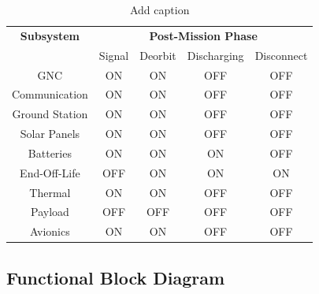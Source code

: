 \begin{table}[htbp]
  \centering
  \caption{Add caption}
    \begin{tabular}{|c|c|c|c|c|}
    \hline
    \textbf{Subsystem} & \multicolumn{4}{c|}{\textbf{Post-Mission Phase}} \\
          & \multicolumn{1}{c}{Signal} & \multicolumn{1}{c}{Deorbit} & \multicolumn{1}{c}{Discharging} & Disconnect \\
    GNC   & \cellcolor[rgb]{ .573,  .816,  .314}ON & \cellcolor[rgb]{ .573,  .816,  .314}ON & \cellcolor[rgb]{ .753,  0,  0}OFF & \cellcolor[rgb]{ .753,  0,  0}OFF \\
Communication & \cellcolor[rgb]{ .573,  .816,  .314}ON & \cellcolor[rgb]{ .573,  .816,  .314}ON & \cellcolor[rgb]{ .753,  0,  0}OFF & \cellcolor[rgb]{ .753,  0,  0}OFF \\
  Ground Station & \cellcolor[rgb]{ .573,  .816,  .314}ON & \cellcolor[rgb]{ .573,  .816,  .314}ON & \cellcolor[rgb]{ .753,  0,  0}OFF & \cellcolor[rgb]{ .753,  0,  0}OFF \\
    Solar Panels  & \cellcolor[rgb]{ .573,  .816,  .314}ON & \cellcolor[rgb]{ .573,  .816,  .314}ON & \cellcolor[rgb]{ .753,  0,  0}OFF & \cellcolor[rgb]{ .753,  0,  0}OFF \\
    Batteries  & \cellcolor[rgb]{ .573,  .816,  .314}ON & \cellcolor[rgb]{ .573,  .816,  .314}ON & \cellcolor[rgb]{ .573,  .816,  .314}ON & \cellcolor[rgb]{ .753,  0,  0}OFF \\
End-Off-Life & \cellcolor[rgb]{ .753,  0,  0}OFF & \cellcolor[rgb]{ .573,  .816,  .314}ON & \cellcolor[rgb]{ .573,  .816,  .314}ON & \cellcolor[rgb]{ .573,  .816,  .314}ON \\
Thermal  & \cellcolor[rgb]{ .573,  .816,  .314}ON & \cellcolor[rgb]{ .573,  .816,  .314}ON & \cellcolor[rgb]{ .753,  0,  0}OFF & \cellcolor[rgb]{ .753,  0,  0}OFF \\
  Payload & \cellcolor[rgb]{ .753,  0,  0}OFF & \cellcolor[rgb]{ .753,  0,  0}OFF & \cellcolor[rgb]{ .753,  0,  0}OFF & \cellcolor[rgb]{ .753,  0,  0}OFF \\
  Avionics & \cellcolor[rgb]{ .753,  0,  0}ON & \cellcolor[rgb]{ .753,  0,  0}ON & \cellcolor[rgb]{ .753,  0,  0}OFF & \cellcolor[rgb]{ .753,  0,  0}OFF \\
    \hline
    \end{tabular}%
  \label{tab:on3}%
\end{table}%


\subsection{Functional Block Diagram}

